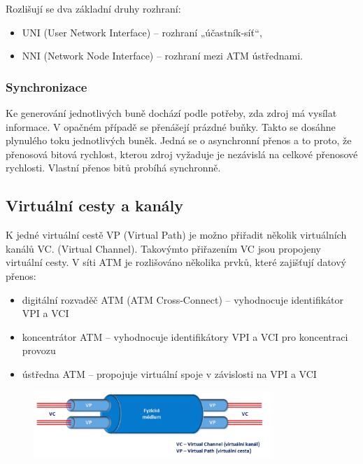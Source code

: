 Rozlišují se dva základní druhy rozhraní:
\begin{itemize}
    \item UNI (User Network Interface) – rozhraní „účastník-síť“,
    \item NNI (Network Node Interface) – rozhraní mezi ATM ústřednami.
\end{itemize}

\subsubsection{Synchronizace}
Ke generování jednotlivých buně dochází podle potřeby, zda zdroj má vysílat informace. V opačném případě se přenášejí prázdné buňky. Takto se dosáhne
plynulého toku jednotlivých buněk. Jedná se o asynchronní přenos a to proto, že přenosová bitová rychlost, kterou zdroj vyžaduje je nezávislá na celkové přenosové rychlosti.  Vlastní přenos bitů probíhá synchronně. 

\subsection{Virtuální cesty a kanály}
K jedné virtuální cestě VP (Virtual Path) je možno přiřadit několik virtuálních kanálů VC. (Virtual Channel). Takovýmto přiřazením VC jsou propojeny virtuální cesty. V síti ATM je rozlišováno několika prvků, které zajišťují datový přenos:

\begin{itemize}
    \item digitální rozvaděč ATM (ATM Cross-Connect) -- vyhodnocuje identifikátor VPI a VCI
    \item koncentrátor ATM -- vyhodnocuje identifikátory VPI a VCI pro koncentraci provozu
    \item ústředna ATM -- propojuje virtuální spoje v závislosti na VPI a VCI
\end{itemize}

\begin{figure} [h]
    \centering
    \includegraphics[width=0.8\textwidth]{snimky/VC.png}
    \label{fig:uml}
\end{figure}


